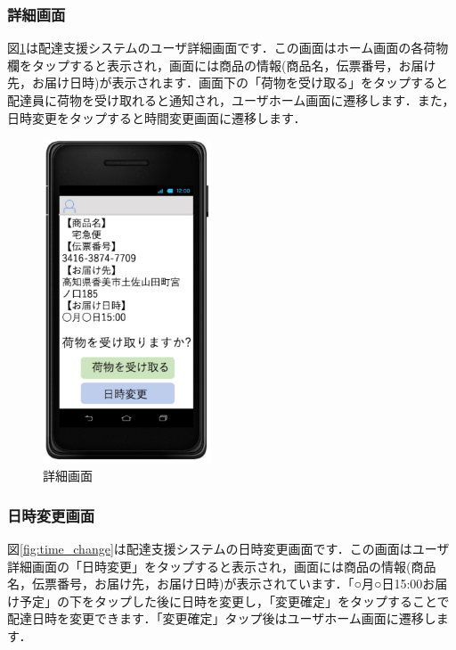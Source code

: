 \documentclass[a4j,titlepage]{jarticle}
\begin{document}
\subsubsection{詳細画面}
図\ref{fig:user_details}は配達支援システムのユーザ詳細画面です．この画面はホーム画面の各荷物欄をタップすると表示され，画面には商品の情報(商品名，伝票番号，お届け先，お届け日時)が表示されます．画面下の「荷物を受け取る」をタップすると配達員に荷物を受け取れると通知され，ユーザホーム画面に遷移します．また，日時変更をタップすると時間変更画面に遷移します．
\begin{figure}[htbp]
 \begin{center}
  \includegraphics[width=50mm]{user_details.pdf}
	\caption{詳細画面}
	\label{fig:user_details}
 \end{center}

\end{figure}

\subsubsection{日時変更画面}
図\ref{fig:time_change}は配達支援システムの日時変更画面です．この画面はユーザ詳細画面の「日時変更」をタップすると表示され，画面には商品の情報(商品名，伝票番号，お届け先，お届け日時)が表示されています．「○月○日15:00お届け予定」の下をタップした後に日時を変更し，「変更確定」をタップすることで配達日時を変更できます．「変更確定」タップ後はユーザホーム画面に遷移します．
\end{document}

